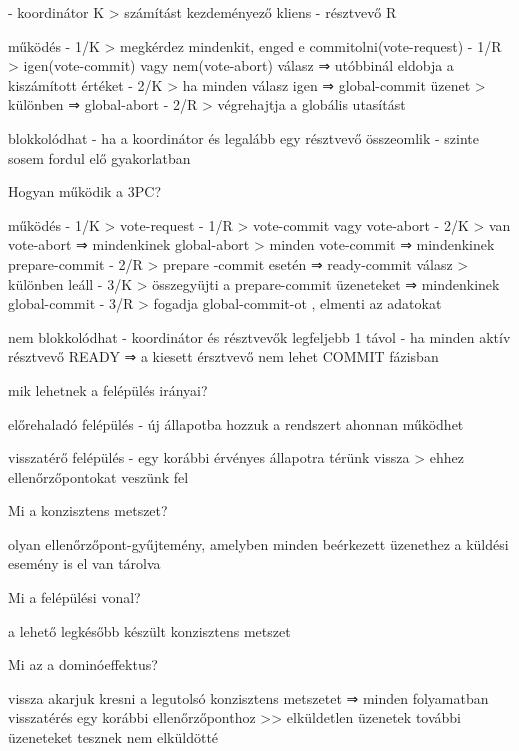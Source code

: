 \documentclass[12pt]{article}
\begin{document}
\begin{description}
        - koordinátor K 
        > számítást kezdeményező kliens
        - résztvevő R
    \item működés
        - 1/K
        > megkérdez mindenkit, enged e commitolni(vote-request)
        - 1/R
        > igen(vote-commit) vagy nem(vote-abort) válasz ⇒ utóbbinál eldobja a kiszámított értéket
        - 2/K
        > ha minden válasz igen ⇒ global-commit üzenet
        > különben ⇒ global-abort
        - 2/R
        > végrehajtja a globális utasítást
    \item blokkolódhat
        - ha a koordinátor és legalább egy résztvevő összeomlik
        - szinte sosem fordul elő gyakorlatban
    \item  Hogyan működik a 3PC?
    \item működés
        - 1/K
        > vote-request
        - 1/R
        > vote-commit vagy vote-abort
        - 2/K
        > van vote-abort ⇒ mindenkinek global-abort 
        > minden vote-commit ⇒ mindenkinek prepare-commit
        - 2/R
        > prepare -commit esetén ⇒ ready-commit válasz
        > különben leáll 
        - 3/K
        > összegyüjti a prepare-commit üzeneteket ⇒ mindenkinek global-commit
        - 3/R
        > fogadja global-commit-ot , elmenti az adatokat
    \item nem blokkolódhat
        - koordinátor és résztvevők legfeljebb 1 távol
        - ha minden aktív résztvevő READY ⇒ a kiesett érsztvevő nem lehet COMMIT fázisban
    \item  mik lehetnek a felépülés irányai?
    \item előrehaladó felépülés
        - új állapotba hozzuk a rendszert ahonnan működhet
    \item visszatérő felépülés
        - egy korábbi érvényes állapotra térünk vissza
        > ehhez ellenőrzőpontokat veszünk fel
    \item  Mi a konzisztens metszet?
    \item olyan ellenőrzőpont-gyűjtemény, amelyben minden beérkezett üzenethez a küldési esemény is el van tárolva
    \item  Mi a felépülési vonal?
    \item a lehető legkésőbb készült konzisztens metszet
    \item  Mi az a dominóeffektus?
    \item vissza akarjuk kresni a legutolsó konzisztens metszetet
        ⇒ minden folyamatban visszatérés egy korábbi ellenőrzőponthoz
        >> elküldetlen üzenetek további üzeneteket tesznek nem elküldötté

\end{description}
\end{document}
